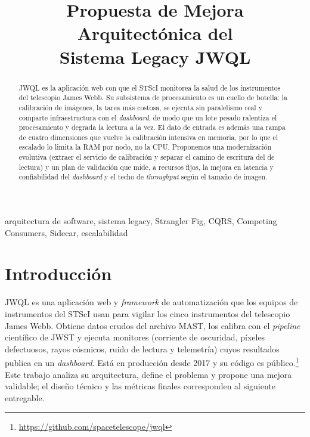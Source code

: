 \documentclass[conference]{IEEEtran}
\begin{document}
\title{Propuesta de Mejora Arquitect\'onica del\\ Sistema Legacy JWQL}

\author{
\and
{}
}

\maketitle

\begin{abstract}
JWQL es la aplicaci\'on web con que el STScI monitorea la salud de los instrumentos del telescopio James Webb. Su subsistema de procesamiento es un cuello de botella: la calibraci\'on de im\'agenes, la tarea m\'as costosa, se ejecuta sin paralelismo real y comparte infraestructura con el \textit{dashboard}, de modo que un lote pesado ralentiza el procesamiento y degrada la lectura a la vez. El dato de entrada es adem\'as una rampa de cuatro dimensiones que vuelve la calibraci\'on intensiva en memoria, por lo que el escalado lo limita la RAM por nodo, no la CPU. Proponemos una modernizaci\'on evolutiva (extraer el servicio de calibraci\'on y separar el camino de escritura del de lectura) y un plan de validaci\'on que mide, a recursos fijos, la mejora en latencia y confiabilidad del \textit{dashboard} y el techo de \textit{throughput} seg\'un el tama\~no de imagen.
\end{abstract}

\begin{IEEEkeywords}
arquitectura de software, sistema legacy, Strangler Fig, CQRS, Competing Consumers, Sidecar, escalabilidad
\end{IEEEkeywords}

\section{Introducci\'on}

JWQL es una aplicaci\'on web y \textit{framework} de automatizaci\'on que los equipos de instrumentos del STScI usan para vigilar los cinco instrumentos del telescopio James Webb. Obtiene datos crudos del archivo MAST, los calibra con el \textit{pipeline} cient\'ifico de JWST y ejecuta monitores (corriente de oscuridad, p\'ixeles defectuosos, rayos c\'osmicos, ruido de lectura y telemetr\'ia) cuyos resultados publica en un \textit{dashboard}. Est\'a en producci\'on desde 2017 y su c\'odigo es p\'ublico.\footnote{\url{https://github.com/spacetelescope/jwql}} Este trabajo analiza su arquitectura, define el problema y propone una mejora validable; el dise\~no t\'ecnico y las m\'etricas finales corresponden al siguiente entregable.
\end{document}
